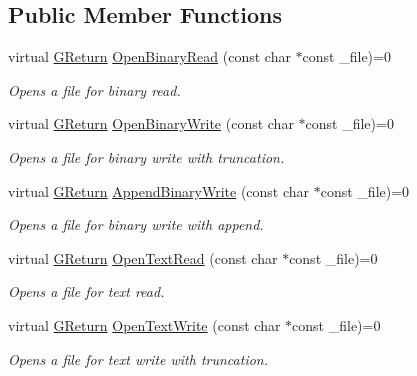 \subsection*{Public Member Functions}
\begin{DoxyCompactItemize}
\item 
virtual \mbox{\hyperlink{namespace_g_w_a67a839e3df7ea8a5c5686613a7a3de21}{G\+Return}} \mbox{\hyperlink{class_g_w_1_1_s_y_s_t_e_m_1_1_g_file_a2744359d5d258b1b59d139101c6809ce}{Open\+Binary\+Read}} (const char $\ast$const \+\_\+file)=0
\begin{DoxyCompactList}\small\item\em Opens a file for binary read. \end{DoxyCompactList}\item 
virtual \mbox{\hyperlink{namespace_g_w_a67a839e3df7ea8a5c5686613a7a3de21}{G\+Return}} \mbox{\hyperlink{class_g_w_1_1_s_y_s_t_e_m_1_1_g_file_a8d5f335bbc6f7c6d798ed27718aa2347}{Open\+Binary\+Write}} (const char $\ast$const \+\_\+file)=0
\begin{DoxyCompactList}\small\item\em Opens a file for binary write with truncation. \end{DoxyCompactList}\item 
virtual \mbox{\hyperlink{namespace_g_w_a67a839e3df7ea8a5c5686613a7a3de21}{G\+Return}} \mbox{\hyperlink{class_g_w_1_1_s_y_s_t_e_m_1_1_g_file_a63311236692181f99fd393fe8e1ca9fc}{Append\+Binary\+Write}} (const char $\ast$const \+\_\+file)=0
\begin{DoxyCompactList}\small\item\em Opens a file for binary write with append. \end{DoxyCompactList}\item 
virtual \mbox{\hyperlink{namespace_g_w_a67a839e3df7ea8a5c5686613a7a3de21}{G\+Return}} \mbox{\hyperlink{class_g_w_1_1_s_y_s_t_e_m_1_1_g_file_ac3ece72ce30e4d1a1c426c53a7a8354a}{Open\+Text\+Read}} (const char $\ast$const \+\_\+file)=0
\begin{DoxyCompactList}\small\item\em Opens a file for text read. \end{DoxyCompactList}\item 
virtual \mbox{\hyperlink{namespace_g_w_a67a839e3df7ea8a5c5686613a7a3de21}{G\+Return}} \mbox{\hyperlink{class_g_w_1_1_s_y_s_t_e_m_1_1_g_file_aebd3e32736b994c0296b7575ab0a2759}{Open\+Text\+Write}} (const char $\ast$const \+\_\+file)=0
\begin{DoxyCompactList}\small\item\em Opens a file for text write with truncation. \end{DoxyCompactList}\item 

\end{DoxyCompactItemize}
